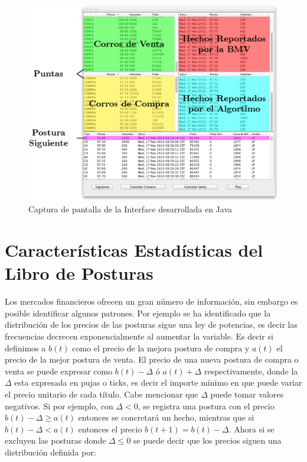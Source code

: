 \documentclass[11pt]{article}
\numberwithin{equation}{section} %
\begin{document}
\begin{landscape}

\begin{figure}[htbp] \centering
\includegraphics{screenshot.png}
\caption{Captura de pantalla de la Interface desarrollada en Java}
\label{java}
\end{figure}

\end{landscape}

\clearpage

\section{Características Estadísticas del Libro de Posturas}

Los mercados financieros ofrecen un gran número de información, sin embargo es posible identificar algunos patrones. Por ejemplo se ha identificado que la distribución de los precios de las posturas sigue una ley de potencias, es decir las frecuencias decrecen exponencialmente al aumentar la variable. Es decir si definimos a $b(t)$ como el precio de la mejora postura de compra y $a(t)$ el precio de la mejor postura de venta. El precio de una nueva postura de compra o venta se puede expresar como $b(t)-\Delta$ ó $a(t)+\Delta$ respectivamente, donde la $\Delta$ esta expresada en pujas o ticks, es decir el importe mínimo en que puede variar el precio unitario de cada título. Cabe mencionar que $\Delta$ puede tomar valores negativos. Si por ejemplo, con $\Delta <0$, se registra una postura con el precio $b(t)-\Delta \geq a(t)$ entonces se concretará un hecho, mientras que si $b(t)-\Delta < a(t)$ entonces el precio $b(t+1)=b(t)-\Delta$. Ahora si se excluyen las posturas donde $\Delta \leq 0$ se puede decir que los precios siguen una distribución definida por:
\end{document}
